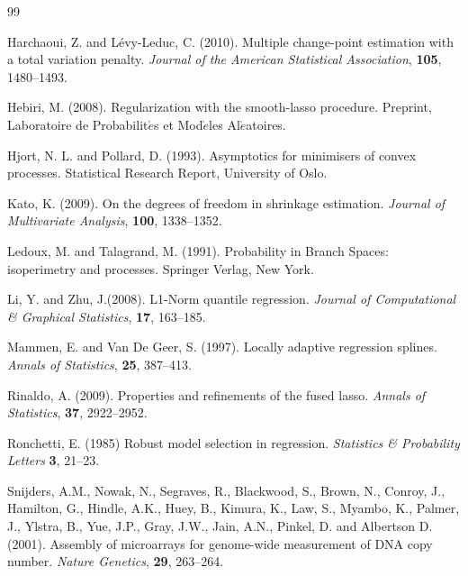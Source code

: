 \documentclass[12pt]{article}
\begin{document}
\begin{thebibliography} {99}
\item Harchaoui, Z. and L\'{e}vy-Leduc, C. (2010). Multiple change-point estimation with
a total variation penalty. \emph{Journal of the American Statistical Association}, {\bf 105}, 1480--1493.

\item Hebiri, M. (2008). Regularization with the smooth-lasso procedure.
 Preprint, Laboratoire de Probabilit$\acute{e}$s et Mod$\grave{e}$les Al$\acute{e}$atoires.

\item
 Hjort, N. L. and Pollard, D. (1993).
Asymptotics for minimisers of convex processes. Statistical Research
Report, University of Oslo.

\item Kato, K. (2009). On the degrees of freedom in shrinkage
estimation. \emph{Journal of Multivariate Analysis}, {\bf 100}, 1338--1352.


\item
 Ledoux, M. and Talagrand, M. (1991).
Probability in Branch Spaces: isoperimetry and processes.
Springer Verlag, New York.

\item Li, Y. and Zhu, J.(2008). L1-Norm quantile regression.
\emph{Journal of Computational \& Graphical Statistics}, {\bf 17}, 163--185.

\item Mammen, E. and Van De Geer, S. (1997). Locally adaptive regression splines.
\emph{Annals of Statistics}, {\bf 25}, 387--413.

\item Rinaldo, A. (2009). Properties and refinements of the fused lasso. \emph{Annals of Statistics},
{\bf 37}, 2922--2952.

\item Ronchetti, E. (1985) Robust model selection in regression.
\emph{Statistics \& Probability Letters} {\bf 3},  21--23.

\item Snijders, A.M., Nowak, N., Segraves, R., Blackwood, S., Brown, N.,
Conroy, J., Hamilton, G., Hindle, A.K., Huey, B., Kimura, K.,
Law, S., Myambo, K., Palmer, J., Ylstra, B., Yue, J.P., Gray, J.W.,
Jain, A.N., Pinkel, D. and Albertson D. (2001). Assembly of microarrays for genome-wide
measurement of DNA copy number. \emph{Nature Genetics},
{\bf 29}, 263--264.


\end{thebibliography}
\end{document}

